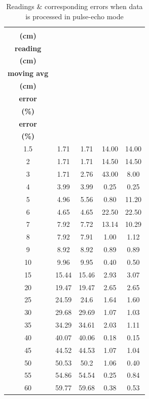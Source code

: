 \begin{table}[!t]
\centering
\caption{Readings \& corresponding errors when data is processed in pulse-echo mode}
\scriptsize
\setlength{\tabcolsep}{3pt}
\begin{tabular}{|c|c|c|c|c|}
\hline
\shortstack{\textbf{Actual}\\\textbf{(cm)}} & \shortstack{\textbf{Raw}\\\textbf{reading}\\\textbf{(cm)}} & \shortstack{\textbf{Raw reading with}\\\textbf{moving avg}\\\textbf{(cm)}} & \shortstack{\textbf{Raw}\\\textbf{error}\\\textbf{(\%)}} & \shortstack{\textbf{Moving avg}\\\textbf{error}\\\textbf{(\%)}} \\ \hline
1.5 & 1.71 & 1.71 & 14.00 & 14.00 \\ \hline
2 & 1.71 & 1.71 & 14.50 & 14.50 \\ \hline
3 & 1.71 & 2.76 & 43.00 & 8.00 \\ \hline
4 & 3.99 & 3.99 & 0.25 & 0.25 \\ \hline
5 & 4.96 & 5.56 & 0.80 & 11.20 \\ \hline
6 & 4.65 & 4.65 & 22.50 & 22.50 \\ \hline
7 & 7.92 & 7.72 & 13.14 & 10.29 \\ \hline
8 & 7.92 & 7.91 & 1.00 & 1.12 \\ \hline
9 & 8.92 & 8.92 & 0.89 & 0.89 \\ \hline
10 & 9.96 & 9.95 & 0.40 & 0.50 \\ \hline
15 & 15.44 & 15.46 & 2.93 & 3.07 \\ \hline
20 & 19.47 & 19.47 & 2.65 & 2.65 \\ \hline
25 & 24.59 & 24.6 & 1.64 & 1.60 \\ \hline
30 & 29.68 & 29.69 & 1.07 & 1.03 \\ \hline
35 & 34.29 & 34.61 & 2.03 & 1.11 \\ \hline
40 & 40.07 & 40.06 & 0.18 & 0.15 \\ \hline
45 & 44.52 & 44.53 & 1.07 & 1.04 \\ \hline
50 & 50.53 & 50.2 & 1.06 & 0.40 \\ \hline
55 & 54.86 & 54.54 & 0.25 & 0.84 \\ \hline
60 & 59.77 & 59.68 & 0.38 & 0.53 \\ \hline

\end{tabular}
\end{table}
